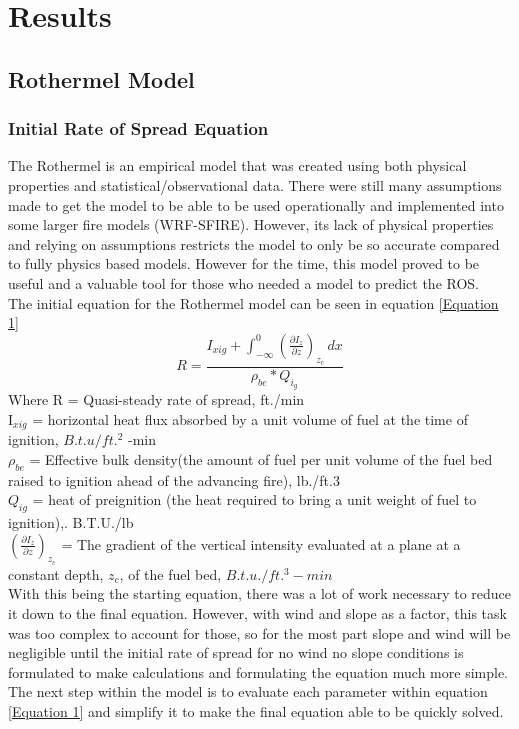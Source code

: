 \documentclass{article}
\begin{document}
\section{Results}
\subsection{Rothermel Model}
\subsubsection{Initial Rate of Spread Equation}
\indent The Rothermel is an empirical model that was created using both physical properties and statistical/observational data. There were still many assumptions made to get the model to be able to be used operationally and implemented into some larger fire models (WRF-SFIRE). However, its lack of physical properties and relying on assumptions restricts the model to only be so accurate compared to fully physics based models. However for the time, this model proved to be useful and a valuable tool for those who needed a model to predict the ROS. \\
\indent The initial equation for the Rothermel model can be seen in equation \ref{Equation 1}
\begin{equation} 
\label{Equation 1}
R = \frac {I_{xig} + \int_{-\infty}^{0} (\frac {\partial I_{z}} {\partial z})_{z_c}\,dx }{\rho_{be} * Q_{i_g}}
\end{equation}
Where R = Quasi-steady rate of spread, ft./min \\

\noindent I$_{xig}$ = horizontal heat flux absorbed by a unit volume of fuel at the time of ignition, $B.t.u/ft.^2$ -min \\

\noindent $\rho_{be}$ = Effective bulk density(the amount of fuel per unit volume of the fuel bed raised to ignition ahead of the advancing fire), lb./ft.3 \\

\noindent $Q_{ig}$ = heat of preignition (the heat required to bring a unit weight of fuel to ignition),. B.T.U./lb \\

\noindent $(\frac {\partial {I_z}} {\partial z})_{z_c}$ = The gradient of the vertical intensity evaluated at a plane at a constant depth, $z_c$, of the fuel bed, $B.t.u./ft.^3 -min$ \\
\indent With this being the starting equation, there was a lot of work necessary to reduce it down to the final equation. However, with wind and slope as a factor, this task was too complex to account for those, so for the most part slope and wind will be negligible until the initial rate of spread for no wind no slope conditions is formulated to make calculations and formulating the equation much more simple. \\
\indent The next step within the model is to evaluate each parameter within equation \ref{Equation 1} and simplify it to make the final equation able to be quickly solved. \\
\end{document}
